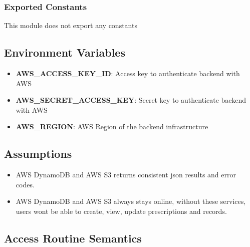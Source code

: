 \documentclass[12pt, titlepage]{article}
\begin{document}
\subsubsection{Exported Constants}
This module does not export any constants

\subsection{Environment Variables}
\begin{itemize}
    \item \textbf{AWS\_ACCESS\_KEY\_ID}: Access key to authenticate backend with AWS
    \item \textbf{AWS\_SECRET\_ACCESS\_KEY}: Secret key to authenticate backend with AWS
    \item \textbf{AWS\_REGION}: AWS Region of the backend infrastructure
\end{itemize}

\subsection{Assumptions}
\begin{itemize}
    \item AWS DynamoDB and AWS S3 returns consistent json results and error codes.
    \item AWS DynamoDB and AWS S3 always stays online, without these services, users wont be able to create, view, update prescriptions and records.
\end{itemize}

\subsection{Access Routine Semantics}
\end{document}
